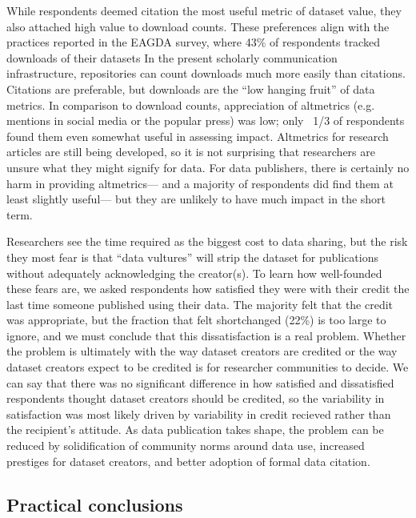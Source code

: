\documentclass[10pt]{article}
\begin{document}
While respondents deemed citation the most useful metric of dataset value, they also attached high value to download counts.
These preferences align with the practices reported in the EAGDA survey, where 43\% of respondents tracked downloads of their datasets\cite{bobrow_establishing_2014}
In the present scholarly communication infrastructure, repositories can count downloads much more easily than citations.
Citations are preferable, but downloads are the ``low hanging fruit'' of data metrics.
In comparison to download counts, appreciation of altmetrics (e.g. mentions in social media or the popular press) was low; only ~1/3 of respondents found them even somewhat useful in assessing impact.
Altmetrics for research articles are still being developed, so it is not surprising that researchers are unsure what they might signify for data.
For data publishers, there is certainly no harm in providing altmetrics--- and a majority of respondents did find them at least slightly useful--- but they are unlikely to have much impact in the short term.

Researchers see the time required as the biggest cost to data sharing, but the risk they most fear is that ``data vultures'' will strip the dataset for publications without adequately acknowledging the creator(s)\cite{kim_institutional_2012}.
To learn how well-founded these fears are, we asked respondents how satisfied they were with their credit the last time someone published using their data.
The majority felt that the credit was appropriate, but the fraction that felt shortchanged (22\%) is too large to ignore, and we must conclude that this dissatisfaction is a real problem.
Whether the problem is ultimately with the way dataset creators are credited or the way dataset creators expect to be credited is for researcher communities to decide.
We can say that there was no significant difference in how satisfied and dissatisfied respondents thought dataset creators should be credited, so the variability in satisfaction was most likely driven by variability in credit recieved rather than the recipient's attitude.
As data publication takes shape, the problem can be reduced by solidification of community norms around data use, increased prestiges for dataset creators, and better adoption of formal data citation.

\subsection*{Practical conclusions}
\end{document}
